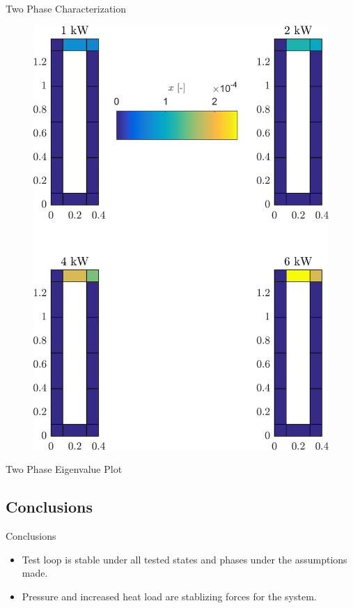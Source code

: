 \documentclass[10pt,t,xcolor=table,compress]{UWMadBeamer}
\begin{document}
\begin{frame}{Two Phase Characterization}
{\begin{figure}
                \includegraphics[scale=0.083]{Distribution_Quality-390K-2Phi}%
            \end{figure}
        }
    \end{frame}
    \begin{frame}{Two Phase Eigenvalue Plot}
        \begin{figure}%
            \resizebox{4in}{!}{
                
            }
        \end{figure}
    \end{frame}
    
    
    \subsection*{Conclusions}
    \begin{frame}{Conclusions}
        \begin{itemize}
            \item Test loop is stable under all tested states and phases under the assumptions made.
            \item Pressure and increased heat load are stablizing forces for the system.
        \end{itemize}
    \end{frame}
    
\end{document}
